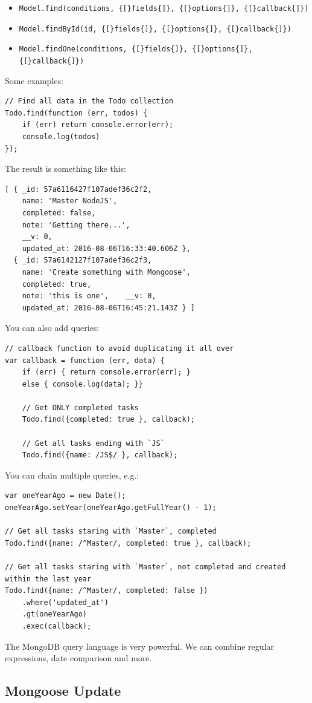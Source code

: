 \documentclass[12pt]{article}
\begin{document}
\begin{itemize}
\item
  \verb!Model.find(conditions, {[}fields{]}, {[}options{]}, {[}callback{]})!
\item
  \verb!Model.findById(id, {[}fields{]}, {[}options{]}, {[}callback{]})!
\item
  \verb!Model.findOne(conditions, {[}fields{]}, {[}options{]}, {[}callback{]})!
\end{itemize}
Some examples:
\begin{Verbatim}
// Find all data in the Todo collection
Todo.find(function (err, todos) {  
	if (err) return console.error(err);  
	console.log(todos)
});
\end{Verbatim}
The result is something like this:
\begin{Verbatim}
[ { _id: 57a6116427f107adef36c2f2,    
	name: 'Master NodeJS',    
	completed: false,    
	note: 'Getting there...',    
	__v: 0,    
	updated_at: 2016-08-06T16:33:40.606Z },  
  { _id: 57a6142127f107adef36c2f3,    
	name: 'Create something with Mongoose',    
	completed: true,    
	note: 'this is one',    __v: 0,    
	updated_at: 2016-08-06T16:45:21.143Z } ]
\end{Verbatim}
You can also add queries:
\begin{Verbatim}
// callback function to avoid duplicating it all over
var callback = function (err, data) {  
	if (err) { return console.error(err); }  
	else { console.log(data); }}
	
	// Get ONLY completed tasks
	Todo.find({completed: true }, callback);
	
	// Get all tasks ending with `JS`
	Todo.find({name: /JS$/ }, callback);
\end{Verbatim}
You can chain multiple queries, e.g.:
\begin{Verbatim}
var oneYearAgo = new Date();
oneYearAgo.setYear(oneYearAgo.getFullYear() - 1);

// Get all tasks staring with `Master`, completed
Todo.find({name: /^Master/, completed: true }, callback);

// Get all tasks staring with `Master`, not completed and created within the last year
Todo.find({name: /^Master/, completed: false })
	.where('updated_at')
	.gt(oneYearAgo)
	.exec(callback);
\end{Verbatim}
The MongoDB query language is very powerful. We can combine regular
expressions, date comparison and more.

\subsection{Mongoose Update}
\end{document}
